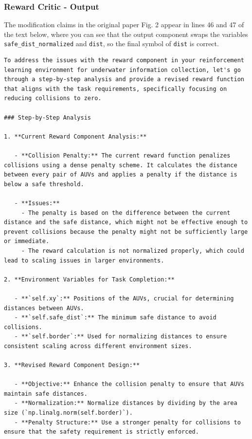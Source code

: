 \documentclass{article}
\begin{document}
\subsubsection{Reward Critic - Output}

The modification claims in the original paper Fig. 2 appear in lines 46 and 47 of the text below, where you can see that the output component swaps the variables \verb|safe_dist_normalized| and \verb|dist|, so the final symbol of \verb|dist| is correct.

\begin{verbatim}
To address the issues with the reward component in your reinforcement learning environment for underwater information collection, let's go through a step-by-step analysis and provide a revised reward function that aligns with the task requirements, specifically focusing on reducing collisions to zero.

### Step-by-Step Analysis

1. **Current Reward Component Analysis:**

   - **Collision Penalty:** The current reward function penalizes collisions using a dense penalty scheme. It calculates the distance between every pair of AUVs and applies a penalty if the distance is below a safe threshold.
   
   - **Issues:**
     - The penalty is based on the difference between the current distance and the safe distance, which might not be effective enough to prevent collisions because the penalty might not be sufficiently large or immediate.
     - The reward calculation is not normalized properly, which could lead to scaling issues in larger environments.

2. **Environment Variables for Task Completion:**

   - **`self.xy`:** Positions of the AUVs, crucial for determining distances between AUVs.
   - **`self.safe_dist`:** The minimum safe distance to avoid collisions.
   - **`self.border`:** Used for normalizing distances to ensure consistent scaling across different environment sizes.

3. **Revised Reward Component Design:**

   - **Objective:** Enhance the collision penalty to ensure that AUVs maintain safe distances.
   - **Normalization:** Normalize distances by dividing by the area size (`np.linalg.norm(self.border)`).
   - **Penalty Structure:** Use a stronger penalty for collisions to ensure that the safety requirement is strictly enforced.


\end{verbatim}
\end{document}
